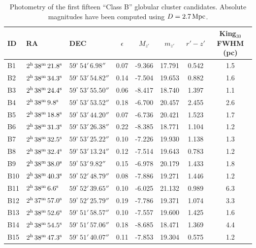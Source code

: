 \documentclass[useAMS,usenatbib]{mn2e}
\begin{document}
\begin{table}
 \centering
  \caption{Photometry of the first fifteen ``Class B'' globular cluster candidates. Absolute magnitudes have been computed using $D = 2.7\,\rm{Mpc}$.}
\label{tab:class_b}  
\begin{tabular}{lllccccc}
	\hline
	ID & RA & DEC & $\epsilon$ & $M_{z'}$ & $m_{z'}$ & $r'-z'$ & King$_{30}$ FWHM (pc) \\
	\hline
	B1 & $2^{\rm{h}}\,38^{\rm{m}}\,21.8^{\rm{s}}$ & $59^\circ\,54'\,6.98''$ & 0.07 & -9.366 & 17.791 & 0.542 & 1.5 \\
	B2 & $2^{\rm{h}}\,38^{\rm{m}}\,34.3^{\rm{s}}$ & $59^\circ\,53'\,54.82''$ & 0.14 & -7.504 & 19.653 & 0.882 & 1.6 \\
	B3 & $2^{\rm{h}}\,38^{\rm{m}}\,24.4^{\rm{s}}$ & $59^\circ\,53'\,55.50''$ & 0.06 & -8.417 & 18.740 & 1.397 & 1.1 \\
	B4 & $2^{\rm{h}}\,38^{\rm{m}}\,9.8^{\rm{s}}$ & $59^\circ\,53'\,53.52''$ & 0.18 & -6.700 & 20.457 & 2.455 & 2.6 \\
	B5 & $2^{\rm{h}}\,38^{\rm{m}}\,18.8^{\rm{s}}$ & $59^\circ\,53'\,44.20''$ & 0.07 & -6.736 & 20.421 & 1.523 & 1.7 \\
	B6 & $2^{\rm{h}}\,38^{\rm{m}}\,31.3^{\rm{s}}$ & $59^\circ\,53'\,26.38''$ & 0.22 & -8.385 & 18.771 & 1.104 & 1.2 \\
	B7 & $2^{\rm{h}}\,38^{\rm{m}}\,32.5^{\rm{s}}$ & $59^\circ\,53'\,25.22''$ & 0.10 & -7.226 & 19.930 & 1.138 & 1.3 \\
	B8 & $2^{\rm{h}}\,38^{\rm{m}}\,32.4^{\rm{s}}$ & $59^\circ\,53'\,13.24''$ & 0.12 & -7.514 & 19.643 & 0.783 & 1.2 \\
	B9 & $2^{\rm{h}}\,38^{\rm{m}}\,38.0^{\rm{s}}$ & $59^\circ\,53'\,9.82''$ & 0.15 & -6.978 & 20.179 & 1.433 & 1.8 \\
	B10 & $2^{\rm{h}}\,38^{\rm{m}}\,40.3^{\rm{s}}$ & $59^\circ\,52'\,48.79''$ & 0.08 & -7.886 & 19.271 & 1.446 & 1.2 \\
	B11 & $2^{\rm{h}}\,38^{\rm{m}}\,6.6^{\rm{s}}$ & $59^\circ\,52'\,39.65''$ & 0.10 & -6.025 & 21.132 & 0.989 & 6.3 \\
	B12 & $2^{\rm{h}}\,37^{\rm{m}}\,57.0^{\rm{s}}$ & $59^\circ\,52'\,25.79''$ & 0.19 & -7.786 & 19.371 & 1.074 & 3.3 \\
	B13 & $2^{\rm{h}}\,38^{\rm{m}}\,52.6^{\rm{s}}$ & $59^\circ\,51'\,58.57''$ & 0.10 & -7.557 & 19.600 & 1.425 & 1.6 \\
	B14 & $2^{\rm{h}}\,38^{\rm{m}}\,54.5^{\rm{s}}$ & $59^\circ\,51'\,57.06''$ & 0.18 & -8.685 & 18.471 & 1.369 & 4.4 \\
	B15 & $2^{\rm{h}}\,38^{\rm{m}}\,47.3^{\rm{s}}$ & $59^\circ\,51'\,40.07''$ & 0.11 & -7.853 & 19.304 & 0.575 & 1.2 \\
	\hline
\end{tabular}
\end{table}



\label{lastpage}
\end{document}
